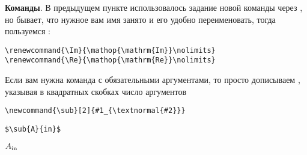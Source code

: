 \textbf{Команды}. В предыдущем пункте использовалось задание новой команды через , но бывает, что нужное вам имя занято и его удобно переименовать, тогда пользуемся : 
\begin{lstlisting}
\renewcommand{\Im}{\mathop{\mathrm{Im}}\nolimits}
\renewcommand{\Re}{\mathop{\mathrm{Re}}\nolimits}
\end{lstlisting}
Если вам нужна команда с обязательными аргументами, то просто дописываем \codeword{[...]}, указывая в квадратных скобках число аргументов \\
\begin{minipage}{0.45\textwidth}
\begin{lstlisting}
\newcommand{\sub}[2]{#1_{\textnormal{#2}}}
\end{lstlisting}
\end{minipage}
\hfill
\vline
\hfill
\begin{minipage}{0.22\textwidth}
\begin{lstlisting}
$\sub{A}{in}$
\end{lstlisting}
\end{minipage}
\hfill
\vline
\hfill
\begin{minipage}{0.22\textwidth}
$\sub{A}{in}$
\end{minipage}

